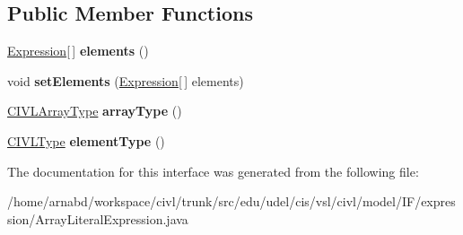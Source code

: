 \subsection*{Public Member Functions}
\begin{DoxyCompactItemize}
\item 
\hypertarget{interfaceedu_1_1udel_1_1cis_1_1vsl_1_1civl_1_1model_1_1IF_1_1expression_1_1ArrayLiteralExpression_a9571540831e7c189af4b7b93ea0ea76b}{}\hyperlink{interfaceedu_1_1udel_1_1cis_1_1vsl_1_1civl_1_1model_1_1IF_1_1expression_1_1Expression}{Expression}\mbox{[}$\,$\mbox{]} {\bfseries elements} ()\label{interfaceedu_1_1udel_1_1cis_1_1vsl_1_1civl_1_1model_1_1IF_1_1expression_1_1ArrayLiteralExpression_a9571540831e7c189af4b7b93ea0ea76b}

\item 
\hypertarget{interfaceedu_1_1udel_1_1cis_1_1vsl_1_1civl_1_1model_1_1IF_1_1expression_1_1ArrayLiteralExpression_a21e65f4d7514ef1552d573a51101306d}{}void {\bfseries set\+Elements} (\hyperlink{interfaceedu_1_1udel_1_1cis_1_1vsl_1_1civl_1_1model_1_1IF_1_1expression_1_1Expression}{Expression}\mbox{[}$\,$\mbox{]} elements)\label{interfaceedu_1_1udel_1_1cis_1_1vsl_1_1civl_1_1model_1_1IF_1_1expression_1_1ArrayLiteralExpression_a21e65f4d7514ef1552d573a51101306d}

\item 
\hypertarget{interfaceedu_1_1udel_1_1cis_1_1vsl_1_1civl_1_1model_1_1IF_1_1expression_1_1ArrayLiteralExpression_a255bc7e37817db3b0aca9695a89e549c}{}\hyperlink{interfaceedu_1_1udel_1_1cis_1_1vsl_1_1civl_1_1model_1_1IF_1_1type_1_1CIVLArrayType}{C\+I\+V\+L\+Array\+Type} {\bfseries array\+Type} ()\label{interfaceedu_1_1udel_1_1cis_1_1vsl_1_1civl_1_1model_1_1IF_1_1expression_1_1ArrayLiteralExpression_a255bc7e37817db3b0aca9695a89e549c}

\item 
\hypertarget{interfaceedu_1_1udel_1_1cis_1_1vsl_1_1civl_1_1model_1_1IF_1_1expression_1_1ArrayLiteralExpression_a140cb1d53718156ce8daf8e2c6b6eaf1}{}\hyperlink{interfaceedu_1_1udel_1_1cis_1_1vsl_1_1civl_1_1model_1_1IF_1_1type_1_1CIVLType}{C\+I\+V\+L\+Type} {\bfseries element\+Type} ()\label{interfaceedu_1_1udel_1_1cis_1_1vsl_1_1civl_1_1model_1_1IF_1_1expression_1_1ArrayLiteralExpression_a140cb1d53718156ce8daf8e2c6b6eaf1}

\end{DoxyCompactItemize}


The documentation for this interface was generated from the following file\+:\begin{DoxyCompactItemize}
\item 
/home/arnabd/workspace/civl/trunk/src/edu/udel/cis/vsl/civl/model/\+I\+F/expression/Array\+Literal\+Expression.\+java\end{DoxyCompactItemize}
